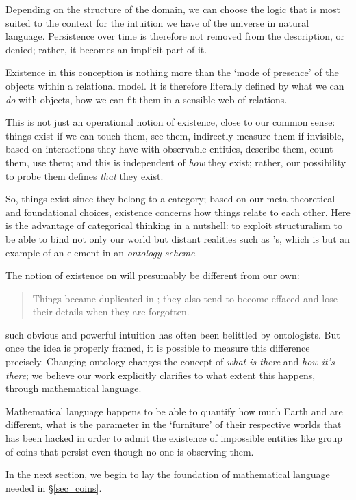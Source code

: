 Depending on the structure of the domain, we can choose the logic that is most suited to the context for the intuition we have of the universe in natural language. Persistence over time is therefore not removed from the description, or denied; rather, it becomes an implicit part of it.

Existence in this conception is nothing more than the `mode of presence' of the objects within a relational model. It is therefore literally defined by what we can \emph{do} with objects, how we can fit them in a sensible web of relations.

This is not just an operational notion of existence, close to our common sense: things exist if we can touch them, see them, indirectly measure them if invisible, based on interactions they have with observable entities, describe them, count them, use them; and this is independent of \emph{how} they exist; rather, our possibility to probe them defines \emph{that} they exist.

So, things exist since they belong to a category; based on our meta\hyp{}theoretical and foundational choices, existence concerns how things relate to each other. Here is the advantage of categorical thinking in a nutshell: to exploit structuralism to be able to bind not only our world but distant realities such as \tlon's, which is but an example of an element in an \emph{ontology scheme}.

The notion of existence on \tlon will presumably be different from our own:
\begin{quote}
	Things became duplicated in \tlon; they also tend to become effaced and lose their details when they are forgotten. \hfill\cite{Borges1963}
\end{quote}
such obvious and powerful intuition has often been belittled by ontologists. But once the idea is properly framed, it is possible to measure this difference precisely. Changing ontology changes the concept of \emph{what is there} and \emph{how it's there}; we believe our work explicitly clarifies to what extent this happens, through mathematical language.

Mathematical language happens to be able to quantify how much Earth and \tlon are different, what is the parameter in the `furniture' of their respective worlds that has been hacked in order to admit the existence of impossible entities like group of coins that persist even though no one is observing them.

In the next section, we begin to lay the foundation of mathematical language needed in §\ref{sec_coins}.